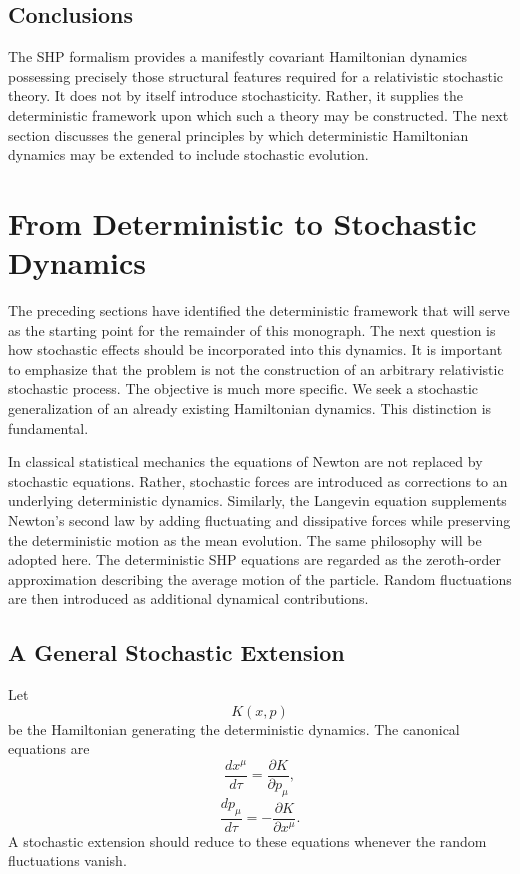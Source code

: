 \subsection{Conclusions}
The SHP formalism provides a manifestly covariant Hamiltonian dynamics
possessing precisely those structural features required for a
relativistic stochastic theory.
It does not by itself introduce stochasticity.
Rather, it supplies the deterministic framework upon which such a theory
may be constructed.
The next section discusses the general principles by which deterministic
Hamiltonian dynamics may be extended to include stochastic evolution.
\section{From Deterministic to Stochastic Dynamics}
The preceding sections have identified the deterministic framework that
will serve as the starting point for the remainder of this monograph.
The next question is how stochastic effects should be incorporated into
this dynamics.
It is important to emphasize that the problem is not the construction of
an arbitrary relativistic stochastic process. The objective is much more
specific. We seek a stochastic generalization of an already existing
Hamiltonian dynamics.
This distinction is fundamental.

In classical statistical mechanics the equations of Newton are not
replaced by stochastic equations. Rather, stochastic forces are
introduced as corrections to an underlying deterministic dynamics.
Similarly, the Langevin equation supplements Newton's second law by
adding fluctuating and dissipative forces while preserving the
deterministic motion as the mean evolution.
The same philosophy will be adopted here.
The deterministic SHP equations are regarded as the zeroth-order
approximation describing the average motion of the particle. Random
fluctuations are then introduced as additional dynamical contributions.
\subsection{A General Stochastic Extension}
Let
\[K(x,p)\]
be the Hamiltonian generating the deterministic dynamics.
The canonical equations are
\[\frac{dx^\mu}{d\tau}=\frac{\partial K}{\partial p_\mu},\]
\[\frac{dp_\mu}{d\tau}=-\frac{\partial K}{\partial x^\mu}.\]
A stochastic extension should reduce to these equations whenever the
random fluctuations vanish.

